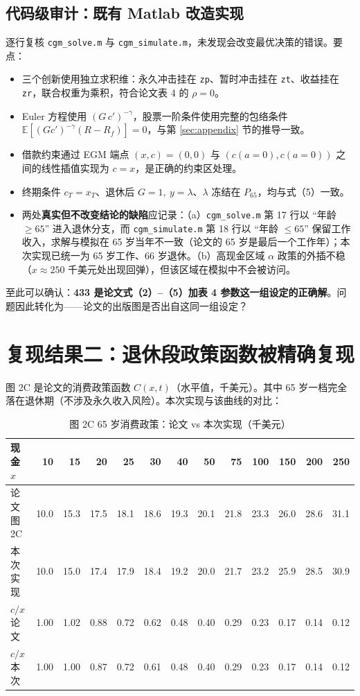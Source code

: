 \documentclass[UTF8,a4paper,11pt,fontset=fandol]{ctexart}
\begin{document}
\subsection{代码级审计：既有 Matlab 改造实现}
逐行复核 \texttt{cgm\_solve.m} 与 \texttt{cgm\_simulate.m}，未发现会改变最优决策的错误。要点：
\begin{itemize}[leftmargin=1.6em,itemsep=1pt]
\item 三个创新使用独立求积维：永久冲击挂在 \texttt{zp}、暂时冲击挂在 \texttt{zt}、收益挂在 \texttt{zr}，联合权重为乘积，符合论文表 4 的 \(\rho=0\)。
\item Euler 方程使用 \((G\,c')^{-\gamma}\)，股票一阶条件使用完整的包络条件 \(\mathbb{E}[(Gc')^{-\gamma}(R-R_f)]=0\)，与第 \ref{sec:appendix} 节的推导一致。
\item 借款约束通过 EGM 端点 \((x,c)=(0,0)\) 与 \((c(a{=}0),c(a{=}0))\) 之间的线性插值实现为 \(c=x\)，是正确的约束区处理。
\item 终期条件 \(c_T=x_T\)、退休后 \(G=1,\ y=\lambda\)、\(\lambda\) 冻结在 \(P_{65}\)，均与式（5）一致。
\item 两处\textbf{真实但不改变结论的缺陷}应记录：（a）\texttt{cgm\_solve.m} 第 17 行以 “年龄 \(\ge 65\)” 进入退休分支，而 \texttt{cgm\_simulate.m} 第 18 行以 “年龄 \(\le 65\)” 保留工作收入，求解与模拟在 65 岁当年不一致（论文的 65 岁是最后一个工作年）；本次实现已统一为 65 岁工作、66 岁退休。（b）高现金区域 \(\alpha\) 政策的外插不稳（\(x\!\approx\!250\) 千美元处出现回弹），但该区域在模拟中不会被访问。
\end{itemize}

至此可以确认：\textbf{433 是论文式（2）--（5）加表 4 参数这一组设定的正确解}。问题因此转化为——论文的出版图是否出自这同一组设定？

\section{复现结果二：退休段政策函数被精确复现}

图 2C 是论文的消费政策函数 \(C(x,t)\)（水平值，千美元）。其中 65 岁一档完全落在退休期（不涉及永久收入风险）。本次实现与该曲线的对比：

\begin{table}[htbp]\centering\small
\caption{图 2C 65 岁消费政策：论文 vs 本次实现（千美元）}\vspace{-2pt}
\begin{tabular}{@{}lrrrrrrrrrrrr@{}}\toprule
现金 \(x\) & 10 & 15 & 20 & 25 & 30 & 40 & 50 & 75 & 100 & 150 & 200 & 250\\\midrule
论文图 2C & 10.0 & 15.3 & 17.5 & 18.1 & 18.6 & 19.3 & 20.1 & 21.8 & 23.3 & 26.0 & 28.6 & 31.1\\
本次实现 & 10.0 & 15.0 & 17.4 & 17.9 & 18.4 & 19.2 & 20.0 & 21.7 & 23.2 & 25.9 & 28.5 & 30.9\\\midrule
\(c/x\) 论文 & 1.00 & 1.02 & 0.88 & 0.72 & 0.62 & 0.48 & 0.40 & 0.29 & 0.23 & 0.17 & 0.14 & 0.12\\
\(c/x\) 本次 & 1.00 & 1.00 & 0.87 & 0.72 & 0.61 & 0.48 & 0.40 & 0.29 & 0.23 & 0.17 & 0.14 & 0.12\\\bottomrule
\end{tabular}
\end{table}
\end{document}

